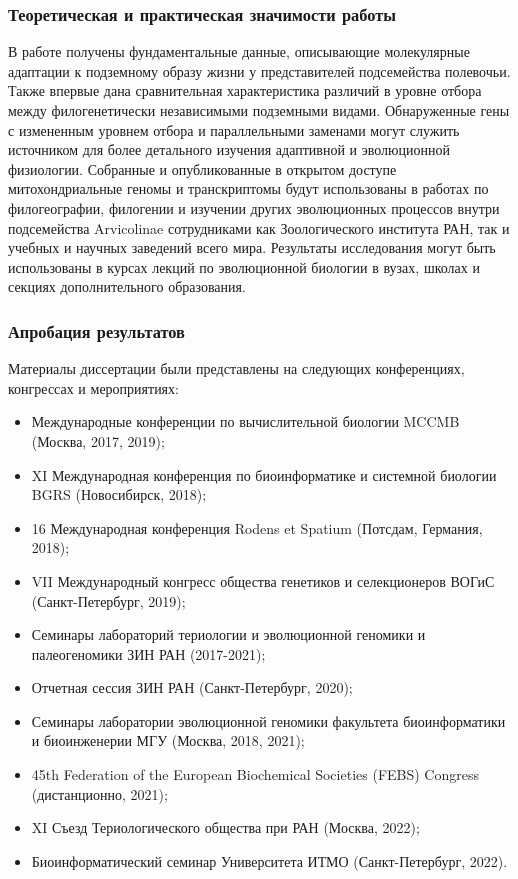 \subsubsection*{Теоретическая и практическая значимости работы}
В работе получены фундаментальные данные, описывающие молекулярные адаптации к подземному образу жизни у представителей подсемейства полевочьи. Также впервые дана сравнительная характеристика различий в уровне отбора между филогенетически независимыми подземными видами. Обнаруженные гены с измененным уровнем отбора и параллельными заменами могут служить источником для более детального изучения адаптивной и эволюционной физиологии. Собранные и опубликованные в открытом доступе митохондриальные геномы и транскриптомы будут использованы в работах по филогеографии, филогении и изучении других эволюционных процессов внутри подсемейства Arvicolinae сотрудниками как Зоологического института РАН, так и учебных и научных заведений всего мира.   
Результаты исследования могут быть использованы в курсах лекций по эволюционной биологии в вузах, школах и секциях дополнительного образования.
%

\subsubsection*{Апробация результатов}

Материалы диссертации были представлены на следующих конференциях, конгрессах и мероприятиях:
\begin{itemize} 
	\item[\textbullet] Международные конференции по вычислительной биологии MCCMB (Москва, 2017, 2019);
	\item[\textbullet] XI Международная конференция по биоинформатике и системной биологии BGRS (Новосибирск, 2018); 
	\item[\textbullet] 16 Международная конференция Rodens et Spatium (Потсдам, Германия, 2018); 
	\item[\textbullet] VII Международный конгресс общества генетиков и селекционеров ВОГиС (Санкт-Петербург, 2019);
	\item[\textbullet] Семинары лабораторий териологии и эволюционной геномики и палеогеномики ЗИН РАН (2017-2021);
	\item[\textbullet] Отчетная сессия ЗИН РАН (Санкт-Петербург, 2020);
	\item[\textbullet] Семинары лаборатории эволюционной геномики факультета биоинформатики и биоинженерии МГУ (Москва, 2018, 2021);
	\item[\textbullet] 45th Federation of the European Biochemical Societies (FEBS) Congress (дистанционно, 2021);
	\item[\textbullet] XI Съезд Териологического общества при РАН (Москва, 2022);
	\item[\textbullet] Биоинформатический семинар Университета ИТМО (Санкт-Петербург, 2022).
\end{itemize}

